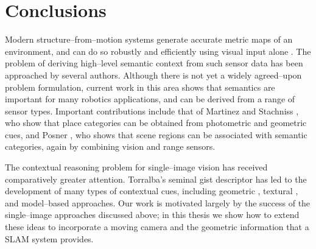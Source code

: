 

\section{Conclusions}
Modern structure--from--motion systems generate accurate metric maps
of an environment, and can do so robustly and efficiently using visual
input alone \cite{Klein07}. The problem of deriving high--level
semantic context from such sensor data has been approached by several
authors. Although there is not yet a widely agreed--upon problem
formulation, current work in this area shows that semantics are
important for many robotics applications, and can be derived from a
range of sensor types. Important contributions include that of
Martinez \cite{Mozos05} and Stachniss \cite{Stachniss05}, who show
that place categories can be obtained from photometric and geometric
cues, and Posner \cite{Posner08}, who shows that scene regions can be
associated with semantic categories, again by combining vision and
range sensors.

The contextual reasoning problem for single--image vision has received
comparatively greater attention. Torralba's seminal gist descriptor
\cite{Torralba03} has led to the development of many types of
contextual cues, including geometric \cite{Hoiem05,Saxena09}, textural
\cite{Heitz08}, and model--based \cite{Lee09} approaches. Our work is
motivated largely by the success of the single--image approaches
discussed above; in this thesis we show how to extend these ideas to
incorporate a moving camera and the geometric information that a SLAM
system provides.

